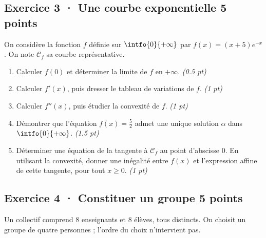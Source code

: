 \mxnewpage{}

\subsection*{Exercice 3 · Une courbe exponentielle \hfill 5 points}On considère la fonction $f$ définie sur $\intfo{0}{+\infty}$ par $f(x)=(x+5)e^{-x}$. On note $\mathcal C_f$ sa courbe représentative.

\begin{enumerate}

\item Calculer $f(0)$ et déterminer la limite de $f$ en $+\infty$. \hfill\textit{(\num{0,5} pt)}

\item Calculer $f' (x)$, puis dresser le tableau de variations de $f$. \hfill\textit{(1 pt)}

\item Calculer $f'' (x)$, puis étudier la convexité de $f$. \hfill\textit{(1 pt)}

\item Démontrer que l'équation $f(x)=\frac{5}{2}$ admet une unique solution $\alpha$ dans $\intfo{0}{+\infty}$. \hfill\textit{(\num{1,5} pt)}

\item Déterminer une équation de la tangente à $\mathcal C_f$ au point d'abscisse $0$. En utilisant la convexité, donner une inégalité entre $f(x)$ et l'expression affine de cette tangente, pour tout $x\ge0$. \hfill\textit{(1 pt)}

\end{enumerate}

\subsection*{Exercice 4 · Constituer un groupe \hfill 5 points}Un collectif comprend $8$ enseignants et $8$ élèves, tous distincts. On choisit un groupe de quatre personnes ; l'ordre du choix n'intervient pas.

